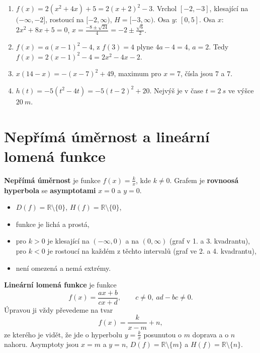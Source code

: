 \begin{solution}
  \begin{enumerate}[label=(\alph*)]
    \item $f(x) = 2(x^2 + 4x) + 5 = 2{(x + 2)}^2 - 3$. Vrchol $[-2, -3]$, klesající na $(-\infty, -2]$, rostoucí na $[-2, \infty)$, $H = [-3, \infty)$. Osa $y$: $[0, 5]$. Osa $x$: $2x^2 + 8x + 5 = 0$, $x = \frac{-8\pm\sqrt{24}}{4} = -2\pm\frac{\sqrt{6}}{2}$.
    \item $f(x) = a{(x - 1)}^2 - 4$, z $f(3) = 4$ plyne $4a - 4 = 4$, $a = 2$. Tedy $f(x) = 2{(x - 1)}^2 - 4 = 2x^2 - 4x - 2$.
    \item $x(14 - x) = -{(x - 7)}^2 + 49$, maximum pro $x = 7$, čísla jsou $7$ a $7$.
    \item $h(t) = -5(t^2 - 4t) = -5{(t - 2)}^2 + 20$. Nejvýš je v čase $t = 2\ \si{s}$ ve výšce $20\ \si{m}$.
  \end{enumerate}
\end{solution}

\section{Nepřímá úměrnost a lineární lomená funkce}\label{sec:lomena-funkce}

\begin{definitionbox}
  \textbf{Nepřímá úměrnost} je funkce $f(x) = \frac{k}{x}$, kde $k\neq 0$. Grafem je \textbf{rovnoosá hyperbola} se \textbf{asymptotami} $x = 0$ a $y = 0$.
  \begin{itemize}
    \item $D(f) = \mathbb{R}\setminus\{0\}$, $H(f) = \mathbb{R}\setminus\{0\}$,
    \item funkce je lichá a prostá,
    \item pro $k > 0$ je klesající na $(-\infty, 0)$ a na $(0, \infty)$ (graf v 1. a 3. kvadrantu), pro $k < 0$ je rostoucí na každém z těchto intervalů (graf ve 2. a 4. kvadrantu),
    \item není omezená a nemá extrémy.
  \end{itemize}

  \textbf{Lineární lomená funkce} je funkce
  \begin{equation*}
    f(x) = \frac{ax + b}{cx + d},\qquad c\neq 0,\ ad - bc\neq 0.
  \end{equation*}
  Úpravou ji vždy převedeme na tvar
  \begin{equation*}
    f(x) = \frac{k}{x - m} + n,
  \end{equation*}
  ze kterého je vidět, že jde o hyperbolu $y = \frac{k}{x}$ posunutou o $m$ doprava a o $n$ nahoru. Asymptoty jsou $x = m$ a $y = n$, $D(f) = \mathbb{R}\setminus\{m\}$ a $H(f) = \mathbb{R}\setminus\{n\}$.
\end{definitionbox}

